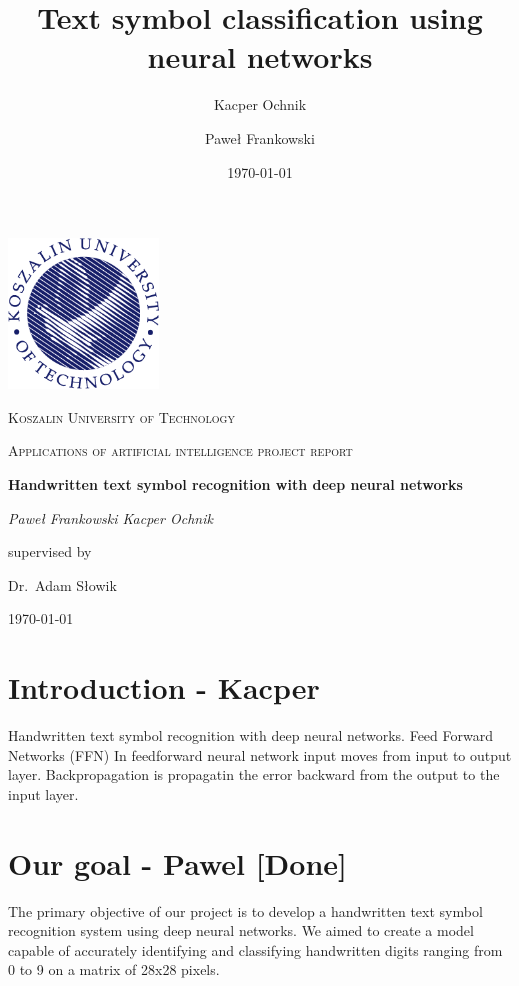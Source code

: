 \documentclass{article}
\title{Text symbol classification using neural networks}
\author{Kacper Ochnik \and Paweł Frankowski}
\date{\today}
\begin{document}
\begin{titlepage}
	\centering
	\includegraphics[width=0.3\textwidth]{Logo_PK_kolor_EN_PNG.png}\par\vspace{1cm}
	{\textsc{Koszalin University of Technology} \par}
	\vspace{1cm}
	{\Large \textsc{Applications of artificial intelligence project report}\par}
	\vspace{1.5cm}
	{\huge\bfseries Handwritten text symbol recognition with deep neural networks
	\par}
	\vspace{2cm}
	{\Large\itshape {Paweł Frankowski \space Kacper Ochnik}\par}
	\vfill
	supervised by\par
	Dr.~Adam Słowik

	\vfill

	{\large \today\par}
\end{titlepage}

\tableofcontents
\newpage

\section{Introduction - Kacper}
Handwritten text symbol recognition with deep neural networks.
Feed Forward Networks (FFN)
In feedforward neural network input moves from input to output layer. Backpropagation is propagatin the error backward from the output to the input layer.

\newpage
\section{Our goal - Pawel  [Done]}

The primary objective of our project is to develop a handwritten text symbol recognition system using deep neural networks. We aimed to create a model capable of accurately identifying and classifying handwritten digits ranging from 0 to 9 on a matrix of 28x28 pixels.
\end{document}
